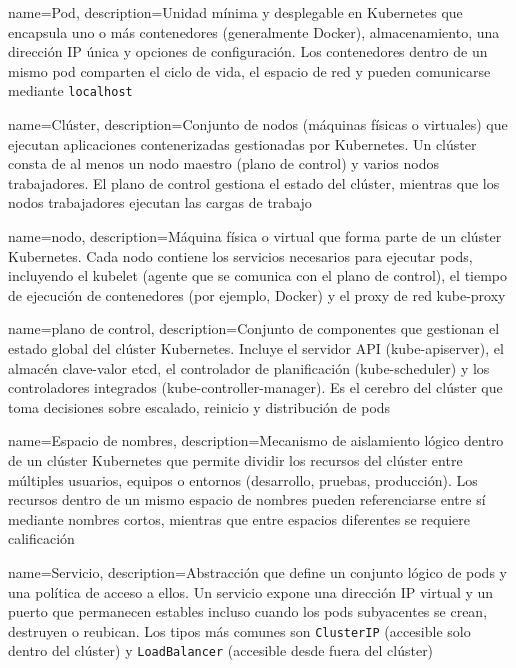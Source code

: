 {
    name={Pod},
    description={Unidad mínima y desplegable en Kubernetes que encapsula uno o más contenedores (generalmente Docker), almacenamiento, una dirección IP única y opciones de configuración. Los contenedores dentro de un mismo pod comparten el ciclo de vida, el espacio de red y pueden comunicarse mediante \texttt{localhost} \citep{kubernetes2025pods}}
}

{
    name={Clúster},
    description={Conjunto de nodos (máquinas físicas o virtuales) que ejecutan aplicaciones contenerizadas gestionadas por Kubernetes. Un clúster consta de al menos un nodo maestro (plano de control) y varios nodos trabajadores. El plano de control gestiona el estado del clúster, mientras que los nodos trabajadores ejecutan las cargas de trabajo \citep{kubernetes2025components}}
}

{
    name={nodo},
    description={Máquina física o virtual que forma parte de un clúster Kubernetes. Cada nodo contiene los servicios necesarios para ejecutar pods, incluyendo el kubelet (agente que se comunica con el plano de control), el tiempo de ejecución de contenedores (por ejemplo, Docker) y el proxy de red kube-proxy \citep{kubernetes2025nodes}}
}

{
    name={plano de control},
    description={Conjunto de componentes que gestionan el estado global del clúster Kubernetes. Incluye el servidor API (kube-apiserver), el almacén clave-valor etcd, el controlador de planificación (kube-scheduler) y los controladores integrados (kube-controller-manager). Es el cerebro del clúster que toma decisiones sobre escalado, reinicio y distribución de pods \citep{kubernetes2025controlplane}}
}

{
    name={Espacio de nombres},
    description={Mecanismo de aislamiento lógico dentro de un clúster Kubernetes que permite dividir los recursos del clúster entre múltiples usuarios, equipos o entornos (desarrollo, pruebas, producción). Los recursos dentro de un mismo espacio de nombres pueden referenciarse entre sí mediante nombres cortos, mientras que entre espacios diferentes se requiere calificación \citep{kubernetes2025namespaces}}
}

{
    name={Servicio},
    description={Abstracción que define un conjunto lógico de pods y una política de acceso a ellos. Un servicio expone una dirección IP virtual y un puerto que permanecen estables incluso cuando los pods subyacentes se crean, destruyen o reubican. Los tipos más comunes son \texttt{ClusterIP} (accesible solo dentro del clúster) y \texttt{LoadBalancer} (accesible desde fuera del clúster) \citep{kubernetes2025services}}
}

